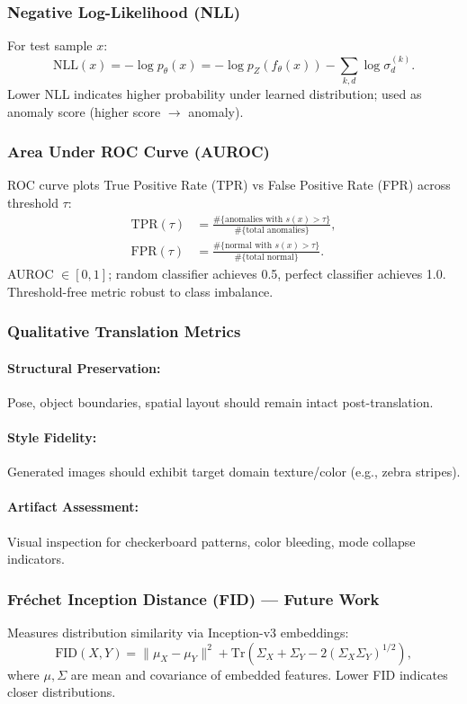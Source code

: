 \documentclass[11pt]{article}
\begin{document}
\subsubsection{Negative Log-Likelihood (NLL)}
For test sample $x$:
\begin{equation}
\text{NLL}(x) = -\log p_{\theta}(x) = -\log p_Z(f_{\theta}(x)) - \sum_{k,d} \log \sigma^{(k)}_d.
\end{equation}
Lower NLL indicates higher probability under learned distribution; used as anomaly score (higher score $\to$ anomaly).

\subsubsection{Area Under ROC Curve (AUROC)}
ROC curve plots True Positive Rate (TPR) vs False Positive Rate (FPR) across threshold $\tau$:
\begin{align}
\text{TPR}(\tau) &= \frac{\#\{\text{anomalies with } s(x) > \tau\}}{\#\{\text{total anomalies}\}}, \\
\text{FPR}(\tau) &= \frac{\#\{\text{normal with } s(x) > \tau\}}{\#\{\text{total normal}\}}.
\end{align}
AUROC $\in [0,1]$; random classifier achieves 0.5, perfect classifier achieves 1.0. Threshold-free metric robust to class imbalance.

\subsubsection{Qualitative Translation Metrics}
\paragraph{Structural Preservation:} Pose, object boundaries, spatial layout should remain intact post-translation.
\paragraph{Style Fidelity:} Generated images should exhibit target domain texture/color (e.g., zebra stripes).
\paragraph{Artifact Assessment:} Visual inspection for checkerboard patterns, color bleeding, mode collapse indicators.

\subsubsection{Fréchet Inception Distance (FID) — Future Work}
Measures distribution similarity via Inception-v3 embeddings:
\begin{equation}
\text{FID}(X, Y) = \|\mu_X - \mu_Y\|^2 + \text{Tr}(\Sigma_X + \Sigma_Y - 2(\Sigma_X \Sigma_Y)^{1/2}),
\end{equation}
where $\mu, \Sigma$ are mean and covariance of embedded features. Lower FID indicates closer distributions.
\end{document}
